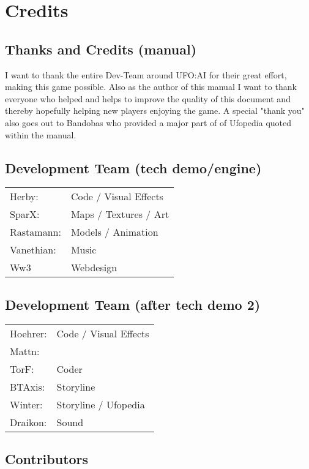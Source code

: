 \newpage

\section{Credits}
\subsection*{Thanks and Credits (manual)}
I want to thank the entire Dev-Team around UFO:AI for their great effort, making this game possible. Also as the author of this manual I want to thank everyone who helped and helps to improve the quality of this document and thereby hopefully helping new players enjoying the game. A special "thank you" also goes out to Bandobas who provided a major part of of Ufopedia quoted within the manual.

\subsection*{Development Team (tech demo/engine)}
\begin{tabular}{ll}
Herby:  			&  Code / Visual Effects	\\ 
SparX:  			&  Maps / Textures / Art	\\ 
Rastamann:  	&  Models / Animation		\\ 
Vanethian:  		&  Music							\\ 
Ww3					&	 Webdesign					\\
\end{tabular} 

\subsection*{Development Team (after tech demo 2)}
\begin{tabular}{ll}
Hoehrer:  			&  Code / Visual Effects	\\ 
Mattn:  				&  									\\ 
TorF:  					&  Coder							\\ 
BTAxis:  				&  Storyline						\\ 
Winter:					&	 Storyline / Ufopedia	\\
Draikon:				& Sound							\\	
\end{tabular} 

\subsection*{Contributors}

